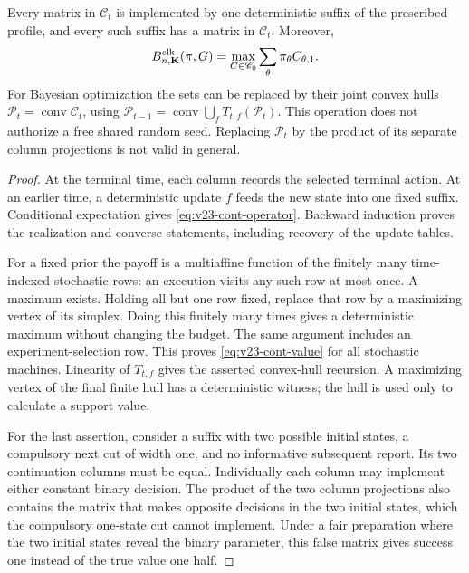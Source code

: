 \begin{proposition}
\label{prop:v23-continuation}
Every matrix in $\mathscr C_t$ is implemented by one deterministic
suffix of the prescribed profile, and every such suffix has a matrix
in $\mathscr C_t$. Moreover,
\begin{equation}\label{eq:v23-cont-value}
 B^{\rm clk}_{n,\mathbf K}(\pi,G)
       =\max_{C\in\mathscr C_0}\sum_\theta\pi_\theta C_{\theta,1}.
\end{equation}
For Bayesian optimization the sets can be replaced by their joint
convex hulls $\mathscr P_t=\operatorname{conv}\mathscr C_t$, using
$\mathscr P_{t-1}=\operatorname{conv}\bigcup_fT_{t,f}(\mathscr P_t)$.
This operation does not authorize a free shared random seed. Replacing
$\mathscr P_t$ by the product of its separate column projections is
not valid in general.
\end{proposition}
\begin{proof}
At the terminal time, each column records the selected terminal action.
At an earlier time, a deterministic update $f$ feeds the new state into
one fixed suffix. Conditional expectation gives
\eqref{eq:v23-cont-operator}. Backward induction proves the realization
and converse statements, including recovery of the update tables.

For a fixed prior the payoff is a multiaffine function of the finitely
many time-indexed stochastic rows: an execution visits any such row
at most once. A maximum exists. Holding all but one row fixed, replace
that row by a maximizing vertex of its simplex. Doing this finitely
many times gives a deterministic maximum without changing the budget.
The same argument includes an experiment-selection row. This proves
\eqref{eq:v23-cont-value} for all stochastic machines. Linearity of
$T_{t,f}$ gives the asserted convex-hull recursion. A maximizing vertex
of the final finite hull has a deterministic witness; the hull is used
only to calculate a support value.

For the last assertion, consider a suffix with two possible initial
states, a compulsory next cut of width one, and no informative
subsequent report. Its two continuation columns must be equal.
Individually each column may implement either constant binary decision.
The product of the two column projections also contains the matrix
that makes opposite decisions in the two initial states, which the
compulsory one-state cut cannot implement. Under a fair preparation
where the two initial states reveal the binary parameter, this false
matrix gives success one instead of the true value one half.
\end{proof}

